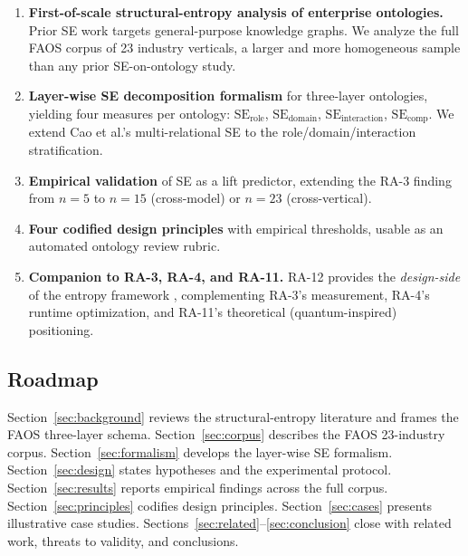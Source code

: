 \documentclass[11pt,a4paper]{article}
\newcommand{\faos}{\textsc{FAOS}}
\newcommand{\se}{\mathrm{SE}}
\newcommand{\serole}{\se_{\text{role}}}
\newcommand{\sedom}{\se_{\text{domain}}}
\newcommand{\seint}{\se_{\text{interaction}}}
\newcommand{\secomp}{\se_{\text{comp}}}
\begin{document}
\begin{enumerate}[leftmargin=2em]
  \item \textbf{First-of-scale structural-entropy analysis of enterprise
    ontologies.} Prior SE work
    \citep{li2016structural,cao2024mrse,wei2025senator,buehler2025selforganizing}
    targets general-purpose knowledge graphs. We analyze the full \faos{}
    corpus of 23 industry verticals, a larger and more homogeneous sample
    than any prior SE-on-ontology study.

  \item \textbf{Layer-wise SE decomposition formalism} for three-layer
    ontologies, yielding four measures per ontology: $\serole$, $\sedom$,
    $\seint$, $\secomp$. We extend Cao et al.'s multi-relational
    SE \citep{cao2024mrse} to the role/domain/interaction stratification.

  \item \textbf{Empirical validation} of SE as a lift predictor,
    extending the RA-3 finding from $n = 5$ to $n = 15$ (cross-model) or
    $n = 23$ (cross-vertical).

  \item \textbf{Four codified design principles} with empirical
    thresholds, usable as an automated ontology review rubric.

  \item \textbf{Companion to RA-3, RA-4, and RA-11.} RA-12 provides the
    \emph{design-side} of the entropy framework
    \citep{luong2026neurosymbolic,luong2026context,luong2026quantum},
    complementing RA-3's measurement, RA-4's runtime optimization, and
    RA-11's theoretical (quantum-inspired) positioning.
\end{enumerate}

\subsection{Roadmap}

Section~\ref{sec:background} reviews the structural-entropy literature
and frames the \faos{} three-layer schema. Section~\ref{sec:corpus}
describes the \faos{} 23-industry corpus. Section~\ref{sec:formalism}
develops the layer-wise SE formalism. Section~\ref{sec:design} states
hypotheses and the experimental protocol. Section~\ref{sec:results}
reports empirical findings across the full corpus. Section~\ref{sec:principles}
codifies design principles. Section~\ref{sec:cases} presents illustrative
case studies. Sections~\ref{sec:related}--\ref{sec:conclusion} close
with related work, threats to validity, and conclusions.
\end{document}
